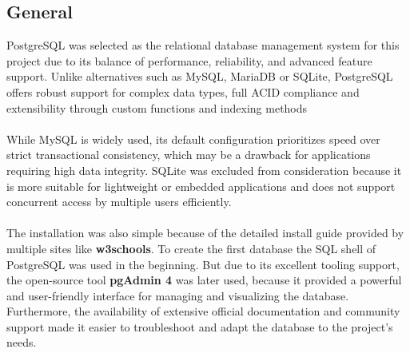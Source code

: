 \documentclass[a4paper,12pt]{report}
\begin{document}
\subsection{General}
PostgreSQL was selected as the relational database management system for this project due to its balance of performance, reliability, and advanced feature support. Unlike alternatives such as MySQL, MariaDB or SQLite, PostgreSQL offers robust support for complex data types, full ACID compliance and extensibility through custom functions and indexing methods\parencite{postgresdocs}\\\\
While MySQL is widely used, its default configuration prioritizes speed over strict transactional consistency, which may be a drawback for applications requiring high data integrity. SQLite was excluded from consideration because it is more suitable for lightweight or embedded applications and does not support concurrent access by multiple users efficiently.\parencite{postgresvsMysql}\\\\
The installation was also simple because of the detailed install guide provided by multiple sites like \textbf{w3schools}. To create the first database the SQL shell of PostgreSQL was used in the beginning. But due to its excellent tooling support, the open-source tool \textbf{pgAdmin 4} was later used, because it  provided a powerful and user-friendly interface for managing and visualizing the database. Furthermore, the availability of extensive official documentation and community support made it easier to troubleshoot and adapt the database to the project’s needs.\parencite{pgAdmin} \parencite{pgsinstallation}\\\\
\end{document}
